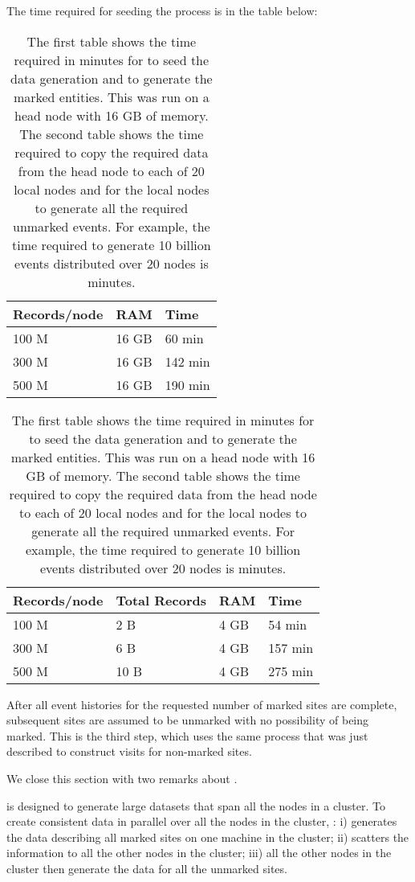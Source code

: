 \documentclass{acm_proc_article-sp}
\begin{document}
The time required for seeding the process is in the table below:
\begin{table}
\begin{center}
\begin{tabular}{|l|l|l|} \hline
Records/node & RAM & Time \\ \hline
100 M & 16 GB & 60 min \\ \hline
300 M & 16 GB & 142 min \\ \hline
500 M & 16 GB & 190 min \\ \hline
\end{tabular}

\medbreak
\medbreak

\begin{tabular}{|l|l|l|l|} \hline
Records/node & Total Records & RAM & Time \\ \hline
100 M & 2 B & 4 GB & 54 min \\ \hline
300 M & 6 B & 4 GB & 157 min \\ \hline
500 M & 10 B & 4 GB & 275 min \\ \hline
\end{tabular}

\caption{The first table shows the time required in minutes for
  \malgen to seed the data generation and to generate the marked
  entities.  This was run on a head node with 16 GB of memory.  The
  second table shows the time required to copy the required data from
  the head node to each of 20 local nodes and for the local nodes to
  generate all the required unmarked events.  For example, the time
  required to generate 10 billion events distributed over 20 nodes is
   minutes. }
\label{table:malgen-times}
\end{center}
\end{table}

After all event histories for the requested number of marked
sites are complete, subsequent sites are assumed to be unmarked
with no possibility of being marked.  This is the third step,
which uses the same process that was just described to construct
visits for non-marked sites.

We close this section with two remarks about \malgenns.

\malgen is designed to generate large datasets that span all the nodes
in a cluster.  To create consistent data in parallel over all the
nodes in the cluster, \malgenns: i) generates the data describing all
marked sites on one machine in the cluster; ii) scatters the
information to all the other nodes in the cluster; iii) all the other
nodes in the cluster then generate the data for all the unmarked
sites.
\end{document}
